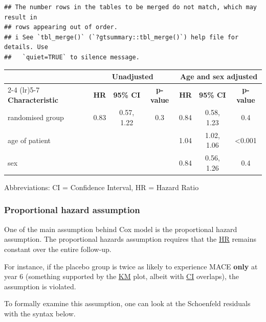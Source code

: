 \documentclass[
]{book}
\begin{document}
\begin{verbatim}
## The number rows in the tables to be merged do not match, which may result in
## rows appearing out of order.
## i See `tbl_merge()` (`?gtsummary::tbl_merge()`) help file for details. Use
##   `quiet=TRUE` to silence message.
\end{verbatim}

\begin{table}[t]
\fontsize{12.0pt}{14.0pt}\selectfont
\begin{tabular*}{\linewidth}{@{\extracolsep{\fill}}lcccccc}
\toprule
 & \multicolumn{3}{c}{{Unadjusted}} & \multicolumn{3}{c}{{Age and sex adjusted}} \\ 
\cmidrule(lr){2-4} \cmidrule(lr){5-7}
\textbf{Characteristic} & \textbf{HR} & \textbf{95\% CI} & \textbf{p-value} & \textbf{HR} & \textbf{95\% CI} & \textbf{p-value} \\ 
\midrule\addlinespace[2.5pt]
randomised group & 0.83 & 0.57, 1.22 & 0.3 & 0.84 & 0.58, 1.23 & 0.4 \\ 
age of patient &  &  &  & 1.04 & 1.02, 1.06 & <0.001 \\ 
sex &  &  &  & 0.84 & 0.56, 1.26 & 0.4 \\ 
\bottomrule
\end{tabular*}
\begin{minipage}{\linewidth}
\vspace{.05em}
Abbreviations: CI = Confidence Interval, HR = Hazard Ratio\\
\end{minipage}
\end{table}

\subsubsection{Proportional hazard assumption}\label{proportional-hazard-assumption}

One of the main assumption behind Cox model is the proportional hazard assumption. The proportional hazards assumption requires that the \hyperref[acronyms_HR]{HR} remains constant over the entire follow-up.

For instance, if the placebo group is twice as likely to experience MACE \textbf{only} at year 6 (something supported by the \hyperref[acronyms_KM]{KM} plot, albeit with \hyperref[acronyms_CI]{CI} overlaps), the assumption is violated.

To formally examine this assumption, one can look at the Schoenfeld residuals with the syntax below.
\end{document}
